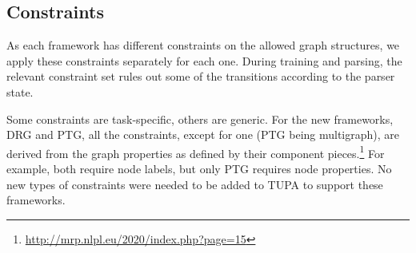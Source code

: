 \documentclass[11pt,a4paper]{article}
\begin{document}
\subsection{Constraints}\label{sec:tupa-constraints}

As each framework has different constraints on the allowed graph structures,
we apply these constraints separately for each one.
During training and parsing, the relevant constraint set rules out some of the transitions
according to the parser state.

Some constraints are task-specific, others are generic.
For the new frameworks, DRG and PTG, all the constraints, except for one (PTG being multigraph), are derived from the graph properties as defined by their component pieces.\footnote{\url{http://mrp.nlpl.eu/2020/index.php?page=15}} For example, both require node labels, but only PTG requires node properties. No new types of constraints were needed to be added to TUPA to support these frameworks.
 
\end{document}
